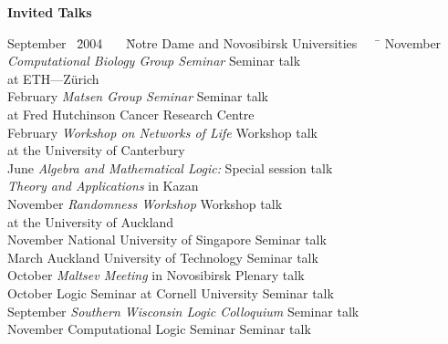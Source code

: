 \documentclass[12pt]{article}
\begin{document}
\centerline{\bf Invited Talks}
\begin{tabbing}
September \ \=2004 \ \ \ \= Notre Dame and Novosibirsk Universities \ \ \ \= \kill
November              \>  {\em Computational Biology Group  Seminar}                      \> Seminar talk \\
            \>              \>  at ETH---Z\"urich                                    \> \\
February              \>  {\em Matsen Group Seminar}                                     \> Seminar talk \\
            \>              \>  at Fred Hutchinson Cancer Research Centre                                    \> \\
February              \>  {\em Workshop on Networks of Life}                                     \> Workshop talk \\
            \>              \>  at the University of Canterbury                                      \> \\
June              \>  {\em Algebra and Mathematical Logic:}  \> Special session talk \\
            \>              \>  {\em Theory and Applications} in Kazan                                    \> \\
November              \>  {\em Randomness Workshop}                                             \> Workshop  talk\\
            \>              \>  at the University of Auckland                                     \> \\
November              \>  National University of Singapore                                          \> Seminar talk\\
March              \>  Auckland University of Technology                                          \> Seminar talk\\
October              \> {\em Maltsev Meeting} in Novosibirsk                                            \> Plenary talk\\
October               \>Logic Seminar at Cornell University                                      \> Seminar talk\\
September          \> {\em Southern Wisconsin Logic Colloquium}                                  \> Seminar talk\\
November          \> Computational Logic Seminar                                              \> Seminar talk\\

\end{tabbing}
\end{document}
